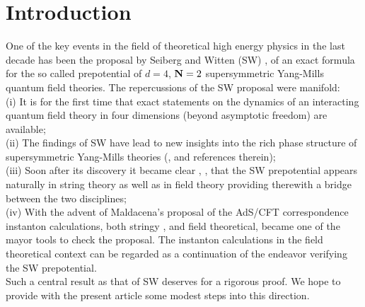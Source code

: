 \documentclass[a4paper,12pt]{article}
\begin{document}
\section{Introduction}
One of the key events in the field of theoretical high energy 
physics in the last decade has been the proposal by Seiberg 
and Witten (SW) \cite{sw1}, \cite{sw2} of an exact formula for 
the so called prepotential of $d=4$, ${\bf N}=2$ supersymmetric 
Yang-Mills quantum field theories. The repercussions of the SW 
proposal were manifold: \\
(i) It is for the first time that exact statements on the dynamics 
of an interacting quantum field theory in four dimensions (beyond 
asymptotic freedom) are available; \\ 
(ii) The findings of SW have lead to new insights into the rich 
phase structure of supersymmetric Yang-Mills theories (\cite{s1}, 
\cite{abel} and references therein); \\
(iii) Soon after its discovery it became clear \cite{vafa}, 
\cite{lerche}, that the SW prepotential appears naturally in 
string theory as well as in field theory providing therewith a 
bridge between the two disciplines; \\
(iv) With the advent of Maldacena's proposal of the AdS/CFT 
correspondence \cite{maldacena} instanton calculations, both stringy 
\cite{green}, \cite{rossi} and field theoretical, \cite{dorey} 
became one of the mayor tools to check the proposal. 
The instanton calculations in the field theoretical context can 
be regarded as a continuation of the endeavor verifying the 
SW prepotential. \\ 
Such a central result as that of SW deserves for a rigorous proof. 
We hope to provide with the present article some modest steps into 
this direction. 
\end{document}

